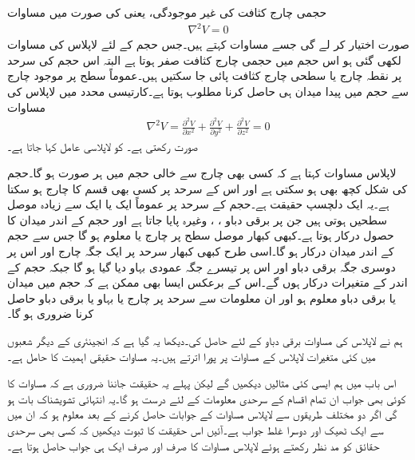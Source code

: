 حجمی چارج کثافت کی غیر موجودگی، یعنی  کی صورت میں مساوات 
\begin{align}\label{مساوات_لاپلاس_لاپلاس_نقطہ_شکل}
\nabla^2 V=0
\end{align}
صورت اختیار کر لے گی جسے  مساوات کہتے ہیں۔جس حجم کے لئے لاپلاس کی مساوات لکھی گئی ہو اس حجم میں حجمی چارج کثافت صفر ہوتا ہے البتہ اس حجم کی سرحد پر نقطہ چارج یا سطحی چارج کثافت پائی جا سکتیں ہیں۔عموماً سطح پر موجود چارج سے حجم میں پیدا میدان ہی حاصل کرنا مطلوب ہوتا ہے۔کارتیسی محدد میں لاپلاس کی مساوات
\begin{align}\label{مساوات_لاپلاس_لاپلاس_کارتیسی_شکل}
\nabla^2 V=\frac{\partial^2 V}{\partial x^2}+\frac{\partial^2 V}{\partial y^2}+\frac{\partial^2 V}{\partial z^2}=0
\end{align}
صورت رکھتی ہے۔ کو لاپلاسی عامل کہا جاتا ہے۔

لاپلاس مساوات کہتا ہے کہ کسی بھی چارج سے خالی حجم میں ہر صورت  ہو گا۔حجم کی شکل کچھ بھی ہو سکتی ہے اور اس کے سرحد پر کسی بھی قسم کا چارج ہو سکتا ہے۔یہ ایک دلچسپ حقیقت ہے۔حجم کے سرحد پر عموماً ایک یا ایک سے زیادہ موصل سطحیں ہوتی ہیں جن پر برقی دباو ، ،  وغیرہ پایا جاتا ہے اور حجم کے اندر میدان کا حصول درکار ہوتا ہے۔کبھی کبھار موصل سطح پر چارج یا  معلوم ہو گا جس سے حجم کے اندر میدان درکار ہو گا۔اسی طرح کبھی کبھار سرحد پر ایک جگہ چارج اور اس پر دوسری جگہ برقی دباو اور اس پر تیسرے  جگہ عمودی بہاو دیا گیا ہو گا جبکہ حجم کے اندر کے متغیرات درکار ہوں گے۔اس کے برعکس ایسا بھی ممکن ہے کہ حجم میں میدان یا برقی دباو معلوم ہو اور ان معلومات سے سرحد پر چارج یا بہاو یا برقی دباو حاصل کرنا ضروری ہو گا۔

ہم نے لاپلاس کی مساوات برقی دباو کے لئے حاصل کی۔دیکھا یہ گیا ہے کہ انجینئری کے دیگر شعبوں میں کئی متغیرات لاپلاس کے مساوات پر پورا اترتے ہیں۔یہ مساوات حقیقی اہمیت کا حامل ہے۔ 

اس باب میں ہم ایسی کئی مثالیں دیکھیں گے لیکن پہلے یہ حقیقت جاننا ضروری ہے کہ مساوات  کا کوئی بھی جواب ان تمام اقسام کے سرحدی معلومات کے لئے درست ہو گا۔یہ انتہائی تشویشناک بات ہو گی اگر دو مختلف طریقوں سے لاپلاس مساوات کے جوابات حاصل کرنے کے بعد معلوم ہو کہ ان میں سے ایک ٹھیک اور دوسرا غلط جواب ہے۔آئیں اس حقیقت کا ثبوت دیکھیں کہ کسی بھی سرحدی حقائق کو مد نظر رکھتے ہوئے لاپلاس مساوات کا صرف اور صرف ایک ہی جواب حاصل ہوتا ہے۔

